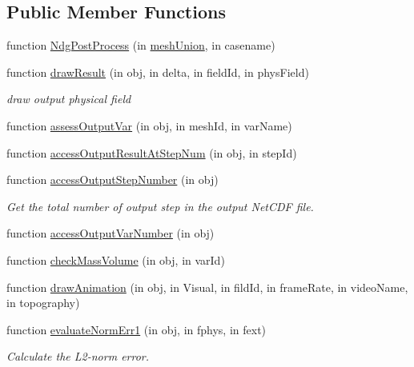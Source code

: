 \subsection*{Public Member Functions}
\begin{DoxyCompactItemize}
\item 
function \hyperlink{class_ndg_post_process_aabd86000ddefc5267769626f1ba7ca9f}{Ndg\+Post\+Process} (in \hyperlink{class_ndg_post_process_ac866eb3ed1f565c92018469cb55ba403}{mesh\+Union}, in casename)
\item 
function \hyperlink{class_ndg_post_process_a5319dfee06cf255bd5a66ab2b0bbc518}{draw\+Result} (in obj, in delta, in field\+Id, in phys\+Field)
\begin{DoxyCompactList}\small\item\em draw output physical field \end{DoxyCompactList}\item 
function \hyperlink{class_ndg_post_process_abbf06625ea4083021193610c65fcc94e}{assess\+Output\+Var} (in obj, in mesh\+Id, in var\+Name)
\item 
function \hyperlink{class_ndg_post_process_a0f803340a064b35bdba5f010664f4af6}{access\+Output\+Result\+At\+Step\+Num} (in obj, in step\+Id)
\item 
function \hyperlink{class_ndg_post_process_aa532ce4d2f6b23f6f0b8ae48f8d3991d}{access\+Output\+Step\+Number} (in obj)
\begin{DoxyCompactList}\small\item\em Get the total number of output step in the output Net\+C\+DF file. \end{DoxyCompactList}\item 
function \hyperlink{class_ndg_post_process_a46e463715da828937b2a432284895687}{access\+Output\+Var\+Number} (in obj)
\item 
function \hyperlink{class_ndg_post_process_a01d8400022c4028aecf357e3a04aefde}{check\+Mass\+Volume} (in obj, in var\+Id)
\item 
function \hyperlink{class_ndg_post_process_ad6ef4dc10609dd863c4caa81c4384dd9}{draw\+Animation} (in obj, in Visual, in fild\+Id, in frame\+Rate, in video\+Name, in topography)
\item 
function \hyperlink{class_ndg_post_process_a4cbaa72f465088097cfd828562f298e9}{evaluate\+Norm\+Err1} (in obj, in fphys, in fext)
\begin{DoxyCompactList}\small\item\em Calculate the L2-\/norm error. \end{DoxyCompactList}\item 

\end{DoxyCompactItemize}

